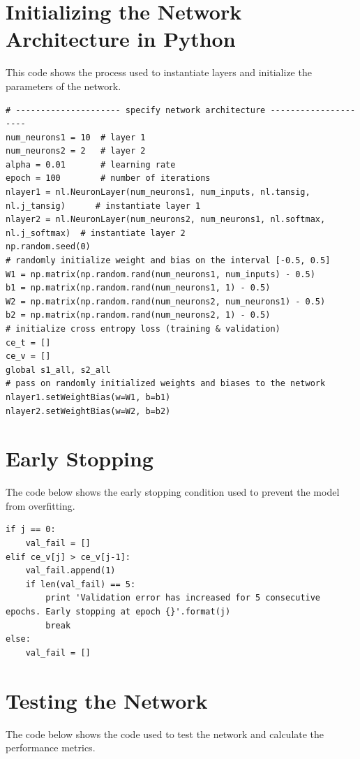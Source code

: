 \documentclass[12pt,halfline,a4paper]{ouparticle}
\begin{document}
\section{Initializing the Network Architecture in Python}
This code shows the process used to instantiate layers and initialize the parameters of the network. 

\begin{lstlisting}[style = Python]
# --------------------- specify network architecture ---------------------
num_neurons1 = 10  # layer 1
num_neurons2 = 2   # layer 2
alpha = 0.01       # learning rate
epoch = 100        # number of iterations
nlayer1 = nl.NeuronLayer(num_neurons1, num_inputs, nl.tansig, nl.j_tansig)      # instantiate layer 1
nlayer2 = nl.NeuronLayer(num_neurons2, num_neurons1, nl.softmax, nl.j_softmax)  # instantiate layer 2
np.random.seed(0)
# randomly initialize weight and bias on the interval [-0.5, 0.5]
W1 = np.matrix(np.random.rand(num_neurons1, num_inputs) - 0.5)
b1 = np.matrix(np.random.rand(num_neurons1, 1) - 0.5)
W2 = np.matrix(np.random.rand(num_neurons2, num_neurons1) - 0.5)
b2 = np.matrix(np.random.rand(num_neurons2, 1) - 0.5)
# initialize cross entropy loss (training & validation)
ce_t = []
ce_v = []
global s1_all, s2_all
# pass on randomly initialized weights and biases to the network
nlayer1.setWeightBias(w=W1, b=b1)
nlayer2.setWeightBias(w=W2, b=b2)
\end{lstlisting} 
\pagebreak

\section{Early Stopping}
The code below shows the early stopping condition used to prevent the model from overfitting. 

\begin{lstlisting}[style = Python]
if j == 0:
	val_fail = []
elif ce_v[j] > ce_v[j-1]:
	val_fail.append(1)
	if len(val_fail) == 5:
		print 'Validation error has increased for 5 consecutive epochs. Early stopping at epoch {}'.format(j)
		break
else:
	val_fail = []
\end{lstlisting} 
\pagebreak

\section{Testing the Network}
The code below shows the code used to test the network and calculate the performance metrics. 
\end{document}
